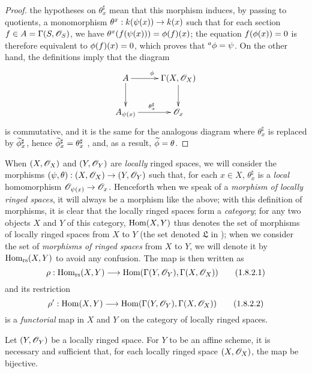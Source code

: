 \begin{proof}
the hypotheses on $\theta_x^\sharp$ mean that this morphism induces, by passing to quotients, a monomorphism $\theta^x:\kres(\psi(x))\to\kres(x)$ such that for each section $f\in A=\Gamma(S,\mathscr{O}_S)$, we have $\theta^x(f(\psi(x)))=\phi(f)(x)$;
the equation $f(\phi(x))=0$ is therefore equivalent to $\phi(f)(x)=0$, which proves that ${}^a\phi=\psi$.
On the other hand, the definitions imply that the diagram
\[
  \xymatrix{
    A\ar[r]^\vphi\ar[d] &
    \Gamma(X,\sh{O}_X)\ar[d]\\
    A_{\psi(x)}\ar[r]^{\theta_x^\sharp} &
    \sh{O}_x
  }
\]
is commutative, and it is the same for the analogous diagram where $\theta_x^\sharp$ is replaced by $\widetilde{\phi}_x^\sharp$, hence $\widetilde{\phi}_x^\sharp=\theta_x^\sharp$ , and, as a result, $\widetilde{\phi}=\theta$.
\end{proof}

\begin{env}[1.8.2]
\label{I.1.8.2}
When $(X,\mathscr{O}_X)$ and $(Y,\mathscr{O}_Y)$ are \emph{locally} ringed spaces, we will consider the morphisms $(\psi,\theta):(X,\sh{O}_X)\to(Y,\sh{O}_Y)$ such that, for each $x\in X$, $\theta_x^\sharp$ is a \emph{local} homomorphism $\sh{O}_{\psi(x)}\to\sh{O}_x$.
Henceforth when we speak
of a \emph{morphism of locally ringed spaces}, it will always be a morphism like the above;
with this definition of morphisms, it is clear that the locally ringed spaces form a \emph{category};
for any two objects $X$ and $Y$ of this category, $\operatorname{Hom}(X,Y)$ thus denotes the set of morphisms of locally ringed spaces from $X$ to $Y$ (the set denoted $\mathfrak{L}$ in );
when we consider the set of \emph{morphisms of ringed spaces} from $X$ to $Y$, we will denote it by $\operatorname{Hom}_\text{rs}(X,Y)$ to avoid any confusion.
The map  is then written as
\[
  \label{I.1.8.2.1}
  \rho:\Hom_\text{rs}(X,Y)\to\Hom(\Gamma(Y,\sh{O}_Y),\Gamma(X,\sh{O}_X))
  \tag{1.8.2.1}
\]
and its restriction
\[
  \label{I.1.8.2.2}
  \rho':\Hom(X,Y)\to\Hom(\Gamma(Y,\sh{O}_Y),\Gamma(X,\sh{O}_X))
  \tag{1.8.2.2}
\]
is a \emph{functorial} map in $X$ and $Y$ on the category of locally ringed spaces.
\end{env}

\begin{corollary}[1.8.3]
\label{I.1.8.3}
Let $(Y,\mathscr{O}_Y)$ be a locally ringed space.
For $Y$ to be an affine scheme, it is necessary and sufficient that, for each locally ringed space $(X,\mathscr{O}_X)$, the map  be bijective.
\end{corollary}

